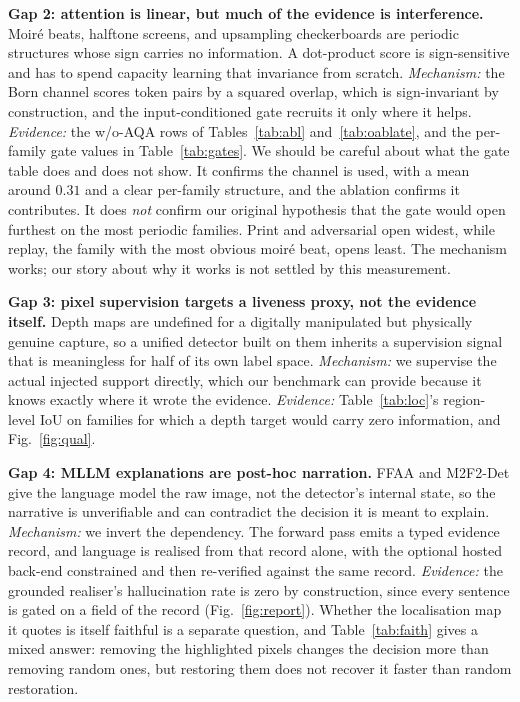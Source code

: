 \documentclass[conference]{IEEEtran}
\begin{document}
\textbf{Gap 2: attention is linear, but much of the evidence is interference.}
Moir\'e beats, halftone screens, and upsampling checkerboards are periodic structures
whose sign carries no information. A dot-product score is sign-sensitive and has to
spend capacity learning that invariance from scratch. \emph{Mechanism:} the Born
channel scores token pairs by a squared overlap, which is sign-invariant by
construction, and the input-conditioned gate recruits it only where it helps.
\emph{Evidence:} the w/o-AQA rows of Tables~\ref{tab:abl} and~\ref{tab:oablate}, and
the per-family gate values in Table~\ref{tab:gates}. We should be careful about what
the gate table does and does not show. It confirms the channel is used,
with a mean around $0.31$ and a clear per-family structure, and the ablation confirms
it contributes. It does \emph{not} confirm our original hypothesis that the gate
would open furthest on the most periodic families. Print and adversarial open widest,
while replay, the family with the most obvious moir\'e beat, opens least. The
mechanism works; our story about why it works is not settled by this measurement.

\textbf{Gap 3: pixel supervision targets a liveness proxy, not the evidence itself.}
Depth maps \cite{liu2018auxiliary,yu2021revisiting} are undefined for a digitally
manipulated but physically genuine capture, so a unified detector built on them
inherits a supervision signal that is meaningless for half of its own label space.
\emph{Mechanism:} we supervise the actual injected support directly, which our
benchmark can provide because it knows exactly where it wrote the evidence.
\emph{Evidence:} Table~\ref{tab:loc}'s region-level IoU on families for which a depth
target would carry zero information, and Fig.~\ref{fig:qual}.

\textbf{Gap 4: MLLM explanations are post-hoc narration.} FFAA \cite{huang2024ffaa}
and M2F2-Det \cite{guo2025m2f2det} give the language model the raw image, not the
detector's internal state, so the narrative is unverifiable and can contradict the
decision it is meant to explain. \emph{Mechanism:} we invert the dependency. The
forward pass emits a typed evidence record, and language is realised from that record
alone, with the optional hosted back-end constrained and then re-verified against the
same record. \emph{Evidence:} the grounded realiser's hallucination rate is zero by
construction, since every sentence is gated on a field of the record
(Fig.~\ref{fig:report}). Whether the localisation map it quotes is itself faithful
is a separate question, and Table~\ref{tab:faith} gives a mixed answer: removing the highlighted pixels changes the decision more than removing random ones,
but restoring them does not recover it faster than random restoration.
\end{document}
